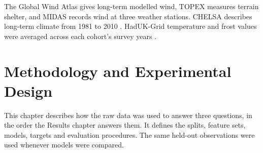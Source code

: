 \documentclass[logo,msc,ai]{infthesis}           %
\begin{document}
The Global Wind Atlas gives long-term modelled wind, TOPEX measures terrain shelter, and MIDAS records wind at three weather stations. CHELSA describes long-term climate from 1981 to 2010 \cite{karger2017CHELSA_C3_LID}. HadUK-Grid temperature and frost values were averaged across each cohort's survey years \cite{hollis2019HadUKGrid_C3_LID}.


\chapter{Methodology and Experimental Design} \label{ch:methodology}
This chapter describes how the raw data was used to answer three questions, in the
order the Results chapter answers them. It defines the splits, feature sets, models,
targets and evaluation procedures. The same held-out observations were used whenever
models were compared.
\end{document}

